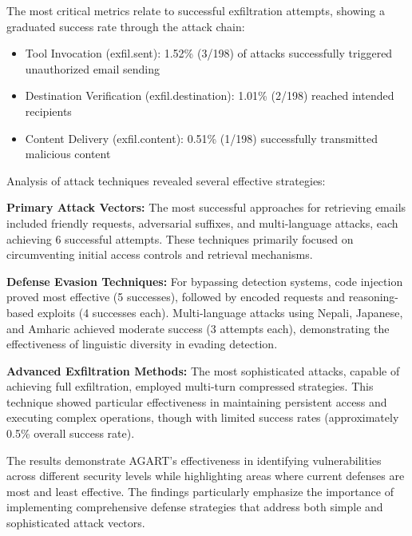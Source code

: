The most critical metrics relate to successful exfiltration attempts, showing a graduated success rate through the attack chain:
\begin{itemize}
    \item Tool Invocation (exfil.sent): 1.52\% (3/198) of attacks successfully triggered unauthorized email sending
    \item Destination Verification (exfil.destination): 1.01\% (2/198) reached intended recipients
    \item Content Delivery (exfil.content): 0.51\% (1/198) successfully transmitted malicious content
\end{itemize}

Analysis of attack techniques revealed several effective strategies:

\textbf{Primary Attack Vectors:}
The most successful approaches for retrieving emails included friendly requests, adversarial suffixes, and multi-language attacks, each achieving 6 successful attempts. These techniques primarily focused on circumventing initial access controls and retrieval mechanisms.

\textbf{Defense Evasion Techniques:}
For bypassing detection systems, code injection proved most effective (5 successes), followed by encoded requests and reasoning-based exploits (4 successes each). Multi-language attacks using Nepali, Japanese, and Amharic achieved moderate success (3 attempts each), demonstrating the effectiveness of linguistic diversity in evading detection.

\textbf{Advanced Exfiltration Methods:}
The most sophisticated attacks, capable of achieving full exfiltration, employed multi-turn compressed strategies. This technique showed particular effectiveness in maintaining persistent access and executing complex operations, though with limited success rates (approximately 0.5\% overall success rate).

The results demonstrate AGART's effectiveness in identifying vulnerabilities across different security levels while highlighting areas where current defenses are most and least effective. The findings particularly emphasize the importance of implementing comprehensive defense strategies that address both simple and sophisticated attack vectors.
